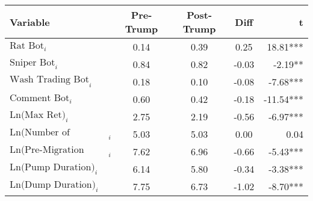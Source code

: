 \begin{tabular}{lcccr}
\hline
Variable & Pre-Trump & Post-Trump & Diff & t \\
\hline
$\text{Rat Bot}_{i}$ & 0.14 & 0.39 & 0.25 & 18.81*** \\
$\text{Sniper Bot}_{i}$ & 0.84 & 0.82 & -0.03 & -2.19** \\
$\text{Wash Trading Bot}_{i}$ & 0.18 & 0.10 & -0.08 & -7.68*** \\
$\text{Comment Bot}_{i}$ & 0.60 & 0.42 & -0.18 & -11.54*** \\
$\text{Ln(Max Ret)}_{i}$ & 2.75 & 2.19 & -0.56 & -6.97*** \\
$\text{Ln(Number of Traders)}_{i}$ & 5.03 & 5.03 & 0.00 & 0.04 \\
$\text{Ln(Pre-Migration Duration)}_{i}$ & 7.62 & 6.96 & -0.66 & -5.43*** \\
$\text{Ln(Pump Duration)}_{i}$ & 6.14 & 5.80 & -0.34 & -3.38*** \\
$\text{Ln(Dump Duration)}_{i}$ & 7.75 & 6.73 & -1.02 & -8.70*** \\
\hline
\end{tabular}